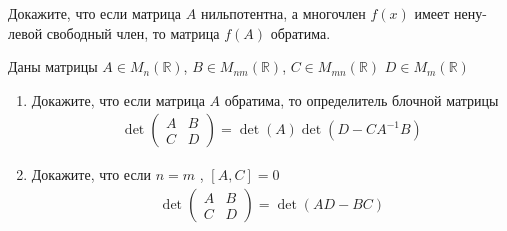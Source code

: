 \begin{prb}
Докажите, что если матрица $A$ нильпотентна, а многочлен $f(x)$ имеет нену-
левой свободный член, то матрица $f(A)$ обратима.
\end{prb}

\begin{prb}
Даны матрицы $A \in M_n(\mathbb{R})$, $B \in M_{nm}(\mathbb{R})$, $C \in M_{mn}(\mathbb{R})$ $D \in M_{m}(\mathbb{R})$ 
\begin{enumerate}
    \item Докажите, что если матрица $A$ обратима, то определитель блочной матрицы
    \begin{gather*}
    \det \left(
        \begin{array}{cc}
           A &  B \\
           C &  D
        \end{array}\right) = \det (A) \det (D -  C A^{-1} B)
    \end{gather*}
    
    \item  Докажите, что если $n = m$ , $\left[A,C\right] = 0$
        \begin{gather*}
            \det \left(
                \begin{array}{cc}
                   A &  B \\
                   C &  D
                \end{array}\right) 
                = \det (AD - BC)
        \end{gather*}
        
\end{enumerate}
\end{prb}


